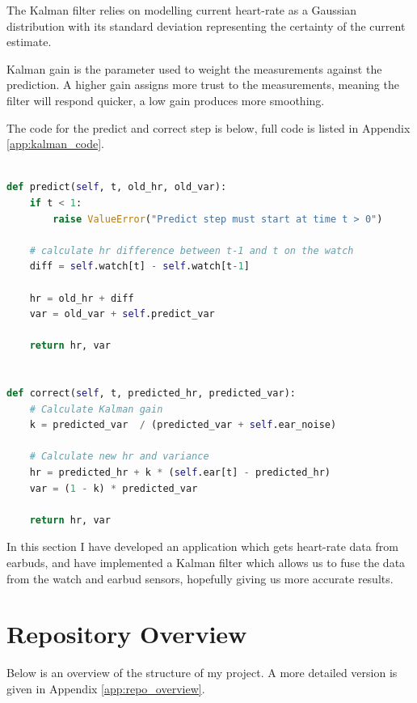 \documentclass[12pt,a4paper,twoside,openany]{report}
\begin{document}
The Kalman filter relies on modelling current heart-rate as a Gaussian
distribution with its standard deviation representing the certainty of the
current estimate.

Kalman gain is the parameter used to weight the measurements against the
prediction. A higher gain assigns more trust to the measurements, meaning the
filter will respond quicker, a low gain produces more smoothing.

The code for the predict and correct step is below, full code is listed in
Appendix \ref{app:kalman_code}.


\begin{lstlisting}[language=Python]

def predict(self, t, old_hr, old_var):
    if t < 1:
        raise ValueError("Predict step must start at time t > 0")

    # calculate hr difference between t-1 and t on the watch
    diff = self.watch[t] - self.watch[t-1]

    hr = old_hr + diff
    var = old_var + self.predict_var

    return hr, var


def correct(self, t, predicted_hr, predicted_var):
    # Calculate Kalman gain
    k = predicted_var  / (predicted_var + self.ear_noise)

    # Calculate new hr and variance
    hr = predicted_hr + k * (self.ear[t] - predicted_hr)
    var = (1 - k) * predicted_var

    return hr, var

\end{lstlisting}




%
%
%
%
%
%

In this section I have developed an application which gets heart-rate data from
earbuds, and have implemented a Kalman filter which allows us to fuse the data
from the watch and earbud sensors, hopefully giving us more accurate results.


\section{Repository Overview}
Below is an overview of the structure of my project. A more detailed version
is given in Appendix \ref{app:repo_overview}.
\end{document}
